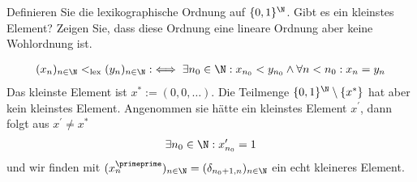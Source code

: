 
\begin{exercise}[240]

Definieren Sie die lexikographische Ordnung auf $\{0,1\}^{\N}$. Gibt es ein kleinstes Element?
Zeigen Sie, dass diese Ordnung eine lineare Ordnung aber keine Wohlordnung ist.

\end{exercise}


\begin{solution}

\begin{align*}
  (x_n)_{n\in\N} <_{\mathrm{lex}} (y_n)_{n\in\N}
  :\iff \exists n_0 \in \N: x_{n_0} < y_{n_0} \land \forall n < n_0: x_n = y_n
\end{align*}
Das kleinste Element ist $x^* :=(0,0,\dots)$.
Die Teilmenge $\{0,1\}^{\N} \setminus \{x^*\}$ hat aber kein kleinstes Element.
Angenommen sie hätte ein kleinstes Element $x^{\prime}$, dann folgt aus
$x^{\prime} \neq x^*$
\begin{align*}
  \exists n_0 \in \N: x^{\prime}_{n_0} = 1
\end{align*}
und wir finden mit $(x^{\primeprime}_n)_{n \in \N} = (\delta_{n_0+1,n})_{n \in \N}$ ein echt kleineres
Element.

\end{solution}
